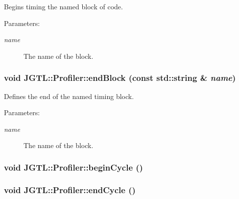 Begins timing the named block of code.

\begin{Desc}
\item[Parameters:]
\begin{description}
\item[{\em name}]The name of the block. \end{description}
\end{Desc}
\hypertarget{class_j_g_t_l_1_1_profiler_42b4439144f39ab3c2f98ca9145aa99c}{
\subsubsection[endBlock]{\setlength{\rightskip}{0pt plus 5cm}void JGTL::Profiler::end\-Block (const std::string \& {\em name})}}
\label{class_j_g_t_l_1_1_profiler_42b4439144f39ab3c2f98ca9145aa99c}


Defines the end of the named timing block.

\begin{Desc}
\item[Parameters:]
\begin{description}
\item[{\em name}]The name of the block. \end{description}
\end{Desc}
\hypertarget{class_j_g_t_l_1_1_profiler_60a7112d1d40528d3270b25b9c0967c9}{
\subsubsection[beginCycle]{\setlength{\rightskip}{0pt plus 5cm}void JGTL::Profiler::begin\-Cycle ()}}
\label{class_j_g_t_l_1_1_profiler_60a7112d1d40528d3270b25b9c0967c9}


\hypertarget{class_j_g_t_l_1_1_profiler_554c28fd5bcb0f181e05b835d3384807}{
\subsubsection[endCycle]{\setlength{\rightskip}{0pt plus 5cm}void JGTL::Profiler::end\-Cycle ()}}
\label{class_j_g_t_l_1_1_profiler_554c28fd5bcb0f181e05b835d3384807}


